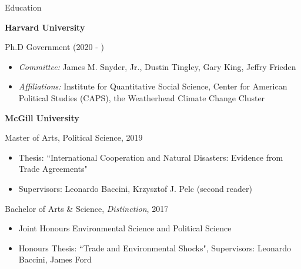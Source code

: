 \documentclass{resume}
\begin{document}

\begin{rSection}{\Large E\MakeLowercase{ducation}}

{\bf Harvard University} \hfill {\em } 

Ph.D Government (2020 - ) \hfill { } 
\NewEntry{}
{\vspace{-\baselineskip}
\begin{itemize}[topsep=0pt]
\medskip
    \item[] \textit{Committee:} James M. Snyder, Jr., Dustin Tingley, Gary King, Jeffry Frieden 
   \item[] \textit{Affiliations:} Institute for Quantitative Social Science, Center for American Political Studies (CAPS), the Weatherhead Climate Change Cluster


\end{itemize}
}

\bigskip

{\bf McGill University} \hfill {\em } 


Master of Arts, Political Science, 2019 \hfill { } 
\NewEntry{}
{\vspace{-\baselineskip}
\begin{itemize}[topsep=0pt]
 \medskip
  \item[] Thesis: ``International Cooperation and Natural Disasters: Evidence from Trade Agreements"
    \vspace{-\baselineskip}
     \medskip
  \item[] Supervisors: Leonardo Baccini, Krzysztof J. Pelc (second reader)
      \vspace{-\baselineskip}
     \medskip


\end{itemize}
}
\medskip
\smallskip

Bachelor of Arts \& Science, \textit{Distinction}, 2017
\NewEntry{}
{
\vspace{-\baselineskip}
\medskip
\begin{itemize}[topsep=0pt]
  \setlength\itemsep{-0.7em}
  \item[] Joint Honours Environmental Science and Political Science
  \item[] Honours Thesis: ``Trade and Environmental Shocks", Supervisors: Leonardo Baccini, James Ford

\end{itemize}
}




\end{rSection}
\end{document}
